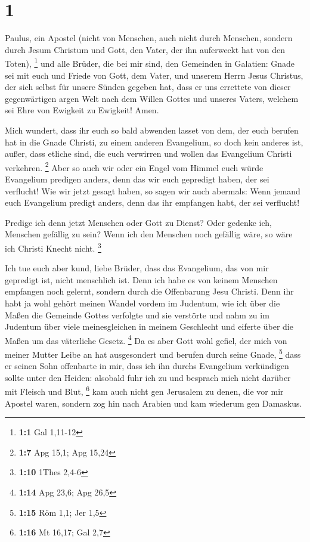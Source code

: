 \hypertarget{section}{%
\section{1}\label{section}}

 Paulus, ein Apostel (nicht von Menschen, auch nicht durch
Menschen, sondern durch Jesum Christum und Gott, den Vater, der ihn
auferweckt hat von den Toten), \footnote{\textbf{1:1} Gal 1,11-12}
 und alle Brüder, die bei mir sind, den Gemeinden in
Galatien:  Gnade sei mit euch und Friede von Gott, dem
Vater, und unserem Herrn Jesus Christus,  der sich selbst
für unsere Sünden gegeben hat, dass er uns errettete von dieser
gegenwärtigen argen Welt nach dem Willen Gottes und unseres Vaters,
 welchem sei Ehre von Ewigkeit zu Ewigkeit! Amen.

 Mich wundert, dass ihr euch so bald abwenden lasset von
dem, der euch berufen hat in die Gnade Christi, zu einem anderen
Evangelium,  so doch kein anderes ist, außer, dass etliche
sind, die euch verwirren und wollen das Evangelium Christi verkehren.
\footnote{\textbf{1:7} Apg 15,1; Apg 15,24}  Aber so auch
wir oder ein Engel vom Himmel euch würde Evangelium predigen anders,
denn das wir euch gepredigt haben, der sei verflucht!  Wie
wir jetzt gesagt haben, so sagen wir auch abermals: Wenn jemand euch
Evangelium predigt anders, denn das ihr empfangen habt, der sei
verflucht!

 Predige ich denn jetzt Menschen oder Gott zu Dienst?
Oder gedenke ich, Menschen gefällig zu sein? Wenn ich den Menschen noch
gefällig wäre, so wäre ich Christi Knecht nicht. \footnote{\textbf{1:10}
  1Thes 2,4-6}

 Ich tue euch aber kund, liebe Brüder, dass das
Evangelium, das von mir gepredigt ist, nicht menschlich ist.
 Denn ich habe es von keinem Menschen empfangen noch
gelernt, sondern durch die Offenbarung Jesu Christi. 
Denn ihr habt ja wohl gehört meinen Wandel vordem im Judentum, wie ich
über die Maßen die Gemeinde Gottes verfolgte und sie verstörte
 und nahm zu im Judentum über viele meinesgleichen in
meinem Geschlecht und eiferte über die Maßen um das väterliche Gesetz.
\footnote{\textbf{1:14} Apg 23,6; Apg 26,5}  Da es aber
Gott wohl gefiel, der mich von meiner Mutter Leibe an hat ausgesondert
und berufen durch seine Gnade, \footnote{\textbf{1:15} Röm 1,1; Jer 1,5}
 dass er seinen Sohn offenbarte in mir, dass ich ihn
durchs Evangelium verkündigen sollte unter den Heiden: alsobald fuhr ich
zu und besprach mich nicht darüber mit Fleisch und Blut, \footnote{\textbf{1:16}
  Mt 16,17; Gal 2,7}  kam auch nicht gen Jerusalem zu
denen, die vor mir Apostel waren, sondern zog hin nach Arabien und kam
wiederum gen Damaskus.

